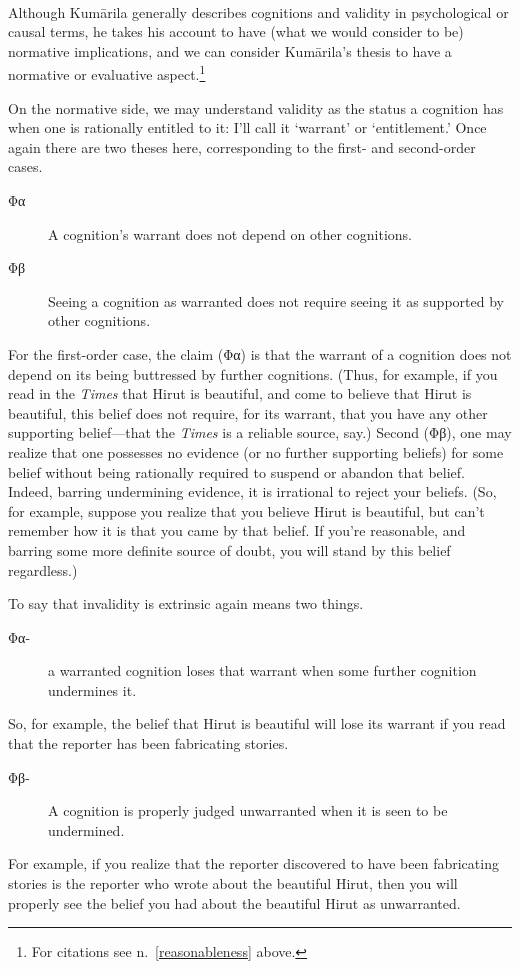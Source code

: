 \documentclass[11pt,letterpaper,oneside]{amsart}
\newcommand{\g}{\textgreek}
\begin{document}
\




Although Kum\=arila generally describes cognitions and validity in psychological or causal terms, he takes his account to have (what we would consider to be) normative implications, and we can consider Kum\=arila's thesis to have a normative or evaluative aspect.\footnote{For citations see n.\ \ref{reasonableness} above.}

On the normative side, we may understand validity as the status a cognition has when one is rationally entitled to it: I'll call it `warrant' or `entitlement.' Once again there are two theses here, corresponding to the first- and second-order cases.\begin{description}\item[\g{Φα}] A cognition's warrant does not depend on other cognitions.
\item[\g{Φβ}] Seeing a cognition as warranted does not require seeing it as supported by other cognitions.\end{description} For the first-order case, the claim (\g{Φα}) is that the warrant of a cognition does not depend on its being buttressed by further cognitions. (Thus, for example, if you read in the \emph{Times} that Hirut is beautiful, and come to believe that Hirut is beautiful, this belief does not require, for its warrant, that you have any other supporting belief---that the \emph{Times} is a reliable source, say.) Second (\g{Φβ}), one may realize that one possesses no evidence (or no further supporting beliefs) for some belief without being rationally required to suspend or abandon that belief. Indeed, barring undermining evidence, it is irrational to reject your beliefs.  (So, for example, suppose you realize that you believe Hirut is beautiful, but can't remember how it is that you came by that belief. If you're reasonable, and barring some more definite source of doubt, you will stand by this belief regardless.)

To say that invalidity is extrinsic again means two things.\begin{description}
\item[\g{Φα-}] a warranted cognition loses that warrant when some further cognition undermines it.\end{description} So, for example, the belief that Hirut is beautiful will lose its warrant if you read that the reporter has been fabricating stories.\begin{description}
\item[\g{Φβ-}] A cognition is properly judged unwarranted when it is seen to be undermined.\end{description} For example, if you realize that the reporter discovered to have been fabricating stories is the reporter who wrote about the beautiful Hirut, then you will properly see the belief you had about the beautiful Hirut as unwarranted.
\end{document}
